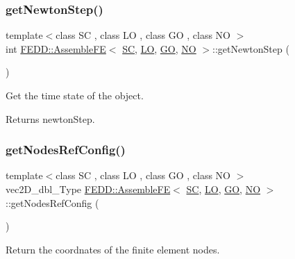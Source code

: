 \subsubsection{\texorpdfstring{get\+Newton\+Step()}{getNewtonStep()}}
{\footnotesize\ttfamily template$<$class SC , class LO , class GO , class NO $>$ \\
int \hyperlink{classFEDD_1_1AssembleFE}{F\+E\+D\+D\+::\+Assemble\+FE}$<$ \hyperlink{fe__test__laplace_8cpp_a79c7e86a57edbb2a5a53242bcd04e41e}{SC}, \hyperlink{fe__test__laplace_8cpp_ad6a38c9f07d3fd633eefca5bccad8410}{LO}, \hyperlink{fe__test__laplace_8cpp_afa2946b509009b4f45eb04bd8c5b27d9}{GO}, \hyperlink{fe__test__laplace_8cpp_a5e24f37b28787429872b6ecb1d0417ce}{NO} $>$\+::get\+Newton\+Step (\begin{DoxyParamCaption}{ }\end{DoxyParamCaption})}



Get the time state of the object. 

\begin{DoxyReturn}{Returns}
newton\+Step. 
\end{DoxyReturn}
\mbox{\label{classFEDD_1_1AssembleFE_a93f37b5e5f8f9a73152abb2e8be4ba4f}} 
\subsubsection{\texorpdfstring{get\+Nodes\+Ref\+Config()}{getNodesRefConfig()}}
{\footnotesize\ttfamily template$<$class SC , class LO , class GO , class NO $>$ \\
vec2\+D\+\_\+dbl\+\_\+\+Type \hyperlink{classFEDD_1_1AssembleFE}{F\+E\+D\+D\+::\+Assemble\+FE}$<$ \hyperlink{fe__test__laplace_8cpp_a79c7e86a57edbb2a5a53242bcd04e41e}{SC}, \hyperlink{fe__test__laplace_8cpp_ad6a38c9f07d3fd633eefca5bccad8410}{LO}, \hyperlink{fe__test__laplace_8cpp_afa2946b509009b4f45eb04bd8c5b27d9}{GO}, \hyperlink{fe__test__laplace_8cpp_a5e24f37b28787429872b6ecb1d0417ce}{NO} $>$\+::get\+Nodes\+Ref\+Config (\begin{DoxyParamCaption}{ }\end{DoxyParamCaption})}



Return the coordnates of the finite element nodes. 

